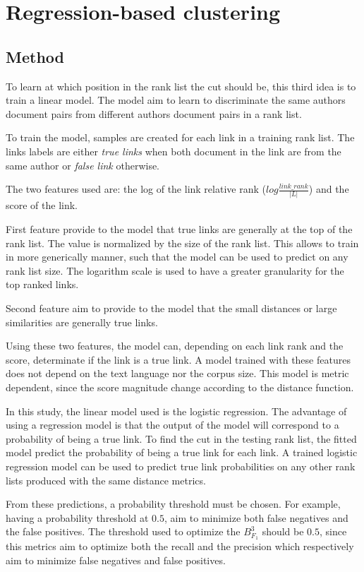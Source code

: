 \section{Regression-based clustering\label{sec:regression_based_clustering}}

\subsection{Method}

To learn at which position in the rank list the cut should be, this third idea is to train a linear model.
The model aim to learn to discriminate the same authors document pairs from different authors document pairs in a rank list.

To train the model, samples are created for each link in a training rank list.
The links labels are either \textit{true links} when both document in the link are from the same author or \textit{false link} otherwise.

The two features used are: the log of the link relative rank ($log \frac{link\_rank}{|L|}$) and the score of the link.

First feature provide to the model that true links are generally at the top of the rank list.
The value is normalized by the size of the rank list.
This allows to train in more generically manner, such that the model can be used to predict on any rank list size.
The logarithm scale is used to have a greater granularity for the top ranked links.

Second feature aim to provide to the model that the small distances or large similarities are generally true links.

Using these two features, the model can, depending on each link rank and the score, determinate if the link is a true link.
A model trained with these features does not depend on the text language nor the corpus size.
This model is metric dependent, since the score magnitude change according to the distance function.

In this study, the linear model used is the logistic regression.
The advantage of using a regression model is that the output of the model will correspond to a probability of being a true link.
To find the cut in the testing rank list, the fitted model predict the probability of being a true link for each link.
A trained logistic regression model can be used to predict true link probabilities on any other rank lists produced with the same distance metrics.

From these predictions, a probability threshold must be chosen.
For example, having a probability threshold at $0.5$, aim to minimize both false negatives and the false positives.
The threshold used to optimize the $B^3_{F_1}$ should be $0.5$, since this metrics aim to optimize both the recall and the precision which respectively aim to minimize false negatives and false positives.


